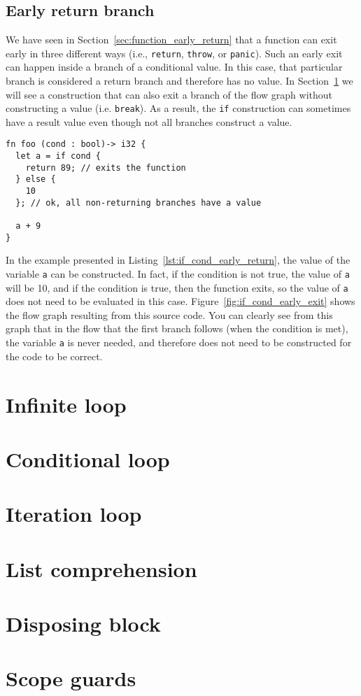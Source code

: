 \subsection{Early return branch}


We have seen in Section~\ref{sec:function_early_return} that a function can exit
early in three different ways (i.e., \texttt{return}, \texttt{throw}, or
\texttt{panic}). Such an early exit can happen inside a branch of a conditional
value. In this case, that particular branch is considered a return branch and
therefore has no value. In Section~\ref{sec:inf_loop} we will see a construction
that can also exit a branch of the flow graph without constructing a value (i.e.
\texttt{break}). As a result, the \texttt{if} construction can sometimes have a
result value even though not all branches construct a value.

\smallskip

\begin{lstlisting}[style=coloredverbatim, caption=Early return in \texttt{if} condition, label=lst:if_cond_early_return]
fn foo (cond : bool)-> i32 {
  let a = if cond {
    return 89; // exits the function
  } else {
    10
  }; // ok, all non-returning branches have a value

  a + 9
}
\end{lstlisting}

In the example presented in Listing~\ref{lst:if_cond_early_return}, the value of
the variable \texttt{a} can be constructed. In fact, if the condition is not
true, the value of \texttt{a} will be 10, and if the condition is true, then the
function exits, so the value of \texttt{a} does not need to be evaluated in this
case. Figure~\ref{fig:if_cond_early_exit} shows the flow graph resulting from
this source code. You can clearly see from this graph that in the flow that the
first branch follows (when the condition is met), the variable \texttt{a} is
never needed, and therefore does not need to be constructed for the code to be
correct.



\section{Infinite loop}%
\label{sec:inf_loop}

\section{Conditional loop}%
\label{sec:while_loop}

\section{Iteration loop}%
\label{sec:for_loop}

\section{List comprehension}%
\label{sec:list_compr}

\section{Disposing block}%
\label{sec:with_block}

\section{Scope guards}%
\label{sec:scope_guards}
